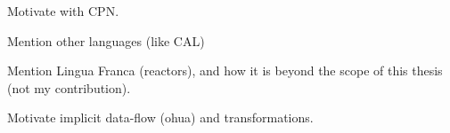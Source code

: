 Motivate with CPN. 

Mention other languages (like CAL)

Mention Lingua Franca (reactors), and how it is beyond the scope of this thesis (not my contribution).

Motivate implicit data-flow (ohua) and transformations.